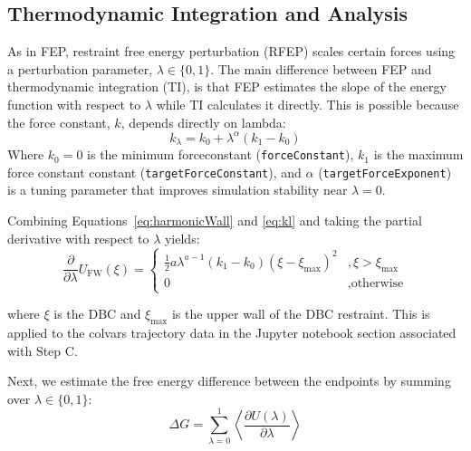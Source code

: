 \documentclass[9pt,tutorial]{Styling/livecoms}
\begin{document}
\subsection{Thermodynamic Integration and Analysis}
As in FEP, restraint free energy perturbation (RFEP) scales certain forces using a perturbation parameter, $\lambda\in \{0,1\}$.
The main difference between FEP and thermodynamic integration (TI), is that FEP estimates the slope of the energy function with respect to $\lambda$ while TI calculates it directly. This is possible because the force constant, $k$, depends directly on lambda:
 \begin{equation}\label{eq:kl}
     k_\lambda = k_0 + \lambda^\alpha (k_1-k_0)
 \end{equation}
Where $k_0 = 0$ is the minimum forceconstant (\texttt{forceConstant}), $k_1$ is the maximum force constant constant (\texttt{targetForceConstant}), and $\alpha$ (\texttt{targetForceExponent}) is a tuning parameter that improves simulation stability near $\lambda=0$.

Combining Equations~\ref{eq:harmonicWall} and \ref{eq:kl} and taking the partial derivative with respect to $\lambda$ yields:
\begin{equation}\label{eq:dUwalldlambda}
    \frac{\partial}{\partial \lambda} U_\mathrm{FW}(\xi) =\begin{cases}
        \frac{1}{2}a\lambda^{a-1}(k_1 - k_0)(\xi-\xi_\mathrm{max})^2&, \xi>\xi_\mathrm{max}\\
        0 &, \text{otherwise}
    \end{cases} 
\end{equation}


where $\xi$ is the DBC and $\xi_\mathrm{max}$ is the upper wall of the DBC restraint.
This is applied to the colvars trajectory data in the Jupyter notebook section associated with Step C. 

Next, we estimate the free energy difference between the endpoints by summing over $\lambda\in\{0,1\}$:
\begin{equation} \label{eq:TI}
    \Delta G = \sum_{\lambda=0}^1 \left\langle
    \frac{\partial U(\lambda)}{\partial \lambda}\right\rangle
\end{equation}
\end{document}
